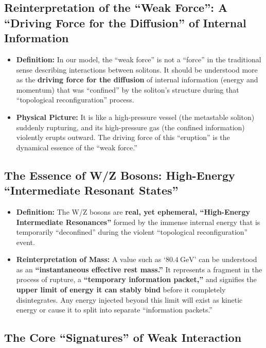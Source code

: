 \documentclass[11pt, a4paper]{article}
\begin{document}
\subsection{Reinterpretation of the ``Weak Force'': A ``Driving Force for the Diffusion'' of Internal Information}

\begin{itemize}
    \item \textbf{Definition:} In our model, the ``weak force'' is not a ``force'' in the traditional sense describing interactions between solitons. It should be understood more as the \textbf{driving force for the diffusion} of internal information (energy and momentum) that was ``confined'' by the soliton's structure during that ``topological reconfiguration'' process.
    \item \textbf{Physical Picture:} It is like a high-pressure vessel (the metastable soliton) suddenly rupturing, and its high-pressure gas (the confined information) violently erupts outward. The driving force of this ``eruption'' is the dynamical essence of the ``weak force.''
\end{itemize}

\subsection{The Essence of W/Z Bosons: High-Energy ``Intermediate Resonant States''}

\begin{itemize}
    \item \textbf{Definition:} The W/Z bosons are \textbf{real, yet ephemeral, ``High-Energy Intermediate Resonances''} formed by the immense internal energy that is temporarily ``deconfined'' during the violent ``topological reconfiguration'' event.
    \item \textbf{Reinterpretation of Mass:} A value such as `$80.4~\text{GeV}$' can be understood as an \textbf{``instantaneous effective rest mass.''} It represents a fragment in the process of rupture, a \textbf{``temporary information packet,''} and signifies the \textbf{upper limit of energy it can stably bind} before it completely disintegrates. Any energy injected beyond this limit will exist as kinetic energy or cause it to split into separate ``information packets.''
\end{itemize}

\subsection{The Core ``Signatures'' of Weak Interaction}
\end{document}
